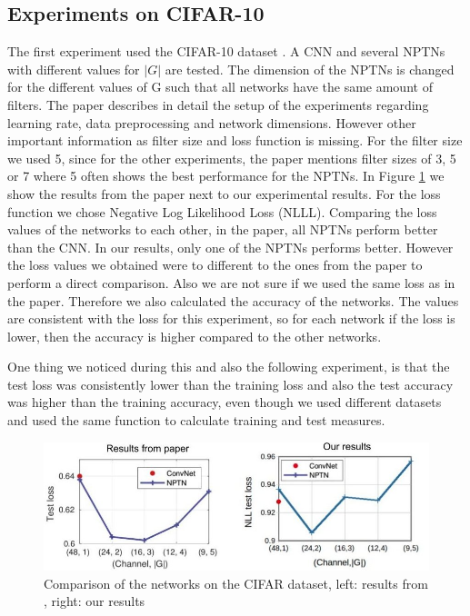 \documentclass{llncs}
\begin{document}
\subsection{Experiments on CIFAR-10}
The first experiment used the CIFAR-10 dataset \cite{CIFAR}. A CNN and several NPTNs with different values for $|G|$ are tested. The dimension of the NPTNs is changed for the different values of G such that all networks have the same amount of filters.
The paper describes in detail the setup of the experiments regarding learning rate, data preprocessing and network dimensions. However other important information as filter size and loss function is missing. 
For the filter size we used 5, since for the other experiments, the paper mentions  filter sizes of 3, 5 or 7 where 5 often shows the best performance for the NPTNs. 
In Figure \ref{pic:first_experiment} we show the results from the paper next to our experimental results. For the loss function we chose Negative Log Likelihood Loss (NLLL). 
Comparing the loss values of the networks to each other, in the paper, all NPTNs perform better than the CNN. In our results, only one of the NPTNs performs better.
However the loss values we obtained were to different to the ones from the paper to perform a direct comparison. 
Also we are not sure if we used the same loss as in the paper.  Therefore we also calculated the accuracy of the networks. The values are consistent with the loss for this experiment, so for each network if the loss is lower, then the accuracy is higher compared to the other networks.

One thing we noticed during this and also the following experiment, is that the test loss was consistently lower than the training loss and also the test accuracy was higher than the training accuracy, even though we used different datasets and used the same function to calculate training and test measures.

\begin{figure}
	\begin{center}
	\includegraphics[scale=0.35]{result_images/experiment1.jpg}
	\caption{Comparison of the networks on the CIFAR dataset, left: results from \cite{NPTN18}, right: our results}
	\label{pic:first_experiment}
	\end{center}
\end{figure}
\end{document}
